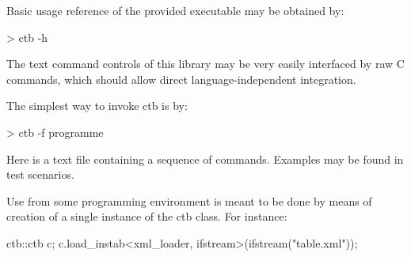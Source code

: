 Basic usage reference of the provided executable may be obtained by:
\begin{code}
> ctb -h
\end{code}

The text command controls of this library may be very easily interfaced by raw C commands, which should allow direct language-independent integration.

The simplest way to invoke ctb is by:
\begin{code}
> ctb -f programme
\end{code}

Here  is a text file containing a sequence of commands. Examples may be found in test scenarios.

Use from some programming environment is meant to be done by means of creation of a single instance of the ctb class. For instance:
\begin{code}
ctb::ctb c;
c.load_instab<xml_loader, ifstream>(ifstream("table.xml"));
\end{code}



